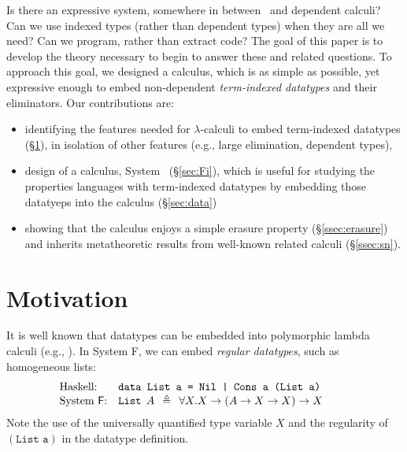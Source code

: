 Is there an expressive system, somewhere in between \Fw\ and dependent calculi?
Can we use indexed types (rather than dependent types) when they are all
we need? Can we program, rather than extract code?
The goal of this paper is to develop the theory necessary to begin to answer
these and related questions. To approach this goal, we designed a calculus,
which is as simple as possible, yet expressive enough to embed non-dependent
\emph{term-indexed datatypes} and their eliminators.
Our contributions are:\vspace*{-3pt}
\begin{itemize}
\item identifying the features needed for $\lambda$-calculi 
    to embed term-indexed datatypes (\S\ref{sec:motiv}),
    in isolation of other features
    (e.g., large elimination, dependent types),
    \vspace*{-3pt}
\item design of a calculus, System \Fi\ (\S\ref{sec:Fi}), which is
    useful for studying the properties languages with term-indexed datatypes
    by embedding those datatyeps into the calculus (\S\ref{sec:data})
\item showing that the calculus enjoys a simple erasure property
    (\S\ref{ssec:erasure}) and inherits metatheoretic results
    from well-known related calculi (\S\ref{ssec:sn}).
\end{itemize}\vspace*{-3pt}


\section{Motivation}
\label{sec:motiv}
It is well known that datatypes can be embedded into polymorphic lambda calculi
(e.g., \cite{AbeMatUus03}).  In System \textsf{F}, we can embed \emph{regular datatypes},
such as homogeneous lists:
\[\!\!\!\!\!\!\!\!\!
\begin{array}{ll}
\text{Haskell:} & \texttt{data List a = Nil | Cons a (List a)} \\
\text{System \textsf{F}:} & \texttt{{List}}\:\: A\:\:\triangleq\:\:\forall X.X\to(A\to X\to X)\to X ~~\;
\end{array}
\]
Note the use of the universally quantified type variable $X$
and the regularity of $(\texttt{List a})$ in the datatype definition.


